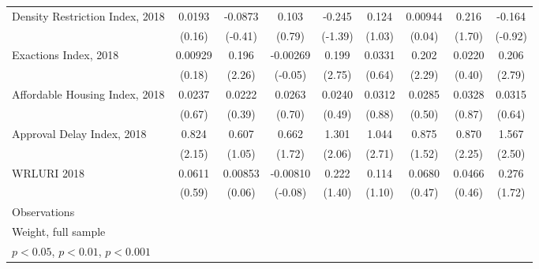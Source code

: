 \begin{table}[htbp]
\begin{tabular}{l*{8}{c}}
\addlinespace
Density Restriction Index, 2018&      0.0193         &     -0.0873         &       0.103         &      -0.245         &       0.124         &     0.00944         &       0.216         &      -0.164         \\
                    &      (0.16)         &     (-0.41)         &      (0.79)         &     (-1.39)         &      (1.03)         &      (0.04)         &      (1.70)         &     (-0.92)         \\
\addlinespace
Exactions Index, 2018&     0.00929         &       0.196\sym{*}  &    -0.00269         &       0.199\sym{**} &      0.0331         &       0.202\sym{*}  &      0.0220         &       0.206\sym{**} \\
                    &      (0.18)         &      (2.26)         &     (-0.05)         &      (2.75)         &      (0.64)         &      (2.29)         &      (0.40)         &      (2.79)         \\
\addlinespace
Affordable Housing Index, 2018&      0.0237         &      0.0222         &      0.0263         &      0.0240         &      0.0312         &      0.0285         &      0.0328         &      0.0315         \\
                    &      (0.67)         &      (0.39)         &      (0.70)         &      (0.49)         &      (0.88)         &      (0.50)         &      (0.87)         &      (0.64)         \\
\addlinespace
Approval Delay Index, 2018&       0.824\sym{*}  &       0.607         &       0.662         &       1.301\sym{*}  &       1.044\sym{**} &       0.875         &       0.870\sym{*}  &       1.567\sym{*}  \\
                    &      (2.15)         &      (1.05)         &      (1.72)         &      (2.06)         &      (2.71)         &      (1.52)         &      (2.25)         &      (2.50)         \\
\addlinespace
WRLURI 2018         &      0.0611         &     0.00853         &    -0.00810         &       0.222         &       0.114         &      0.0680         &      0.0466         &       0.276         \\
                    &      (0.59)         &      (0.06)         &     (-0.08)         &      (1.40)         &      (1.10)         &      (0.47)         &      (0.46)         &      (1.72)         \\
\midrule
Observations        &                     &                     &                     &                     &                     &                     &                     &                     \\
\bottomrule
\multicolumn{9}{l}{\footnotesize Weight, full sample}\\
\multicolumn{9}{l}{\footnotesize \sym{*} \(p<0.05\), \sym{**} \(p<0.01\), \sym{***} \(p<0.001\)}\\
\end{tabular}
\end{table}
